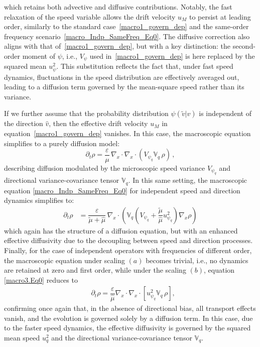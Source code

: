 \documentclass[a4paper]{article}
\theoremstyle{Theorem}\newtheorem{proposition}{Proposition}[section]
\theoremstyle{Remark}\newtheorem{remark}{Remark}[section]
\theoremstyle{Theorem}\newtheorem{theorem}{Theorem}[section]
\newcommand{\hv}{\hat{v}}
\newcommand{\tv}{\tilde{v}}
\newcommand{\hmu}{\hat{\mu}}
\newcommand{\tmu}{\tilde{\mu}}
\begin{document}
which retains both advective and diffusive contributions. Notably, the fast relaxation of the speed variable allows the drift velocity $u_M$ to persist at leading order, similarly to the standard case~\eqref{macro1_govern_dep} and the same-order frequency scenario~\eqref{macro_Indp_SameFreq_Eq0}.  The diffusive correction also aligns with that of~\eqref{macro1_govern_dep}, but with a key distinction: the second-order moment of $\psi$, i.e., $V_\psi$  used in~\eqref{macro1_govern_dep} is here replaced by the squared mean $u_\psi^2$. This substitution reflects the fact that, under fast speed dynamics, fluctuations in the speed distribution are effectively averaged out, leading to a diffusion term governed by the mean-square speed rather than its variance.

If we further assume that the probability distribution $\psi(\tv|\hv)$ is independent of the direction $\hv$, then the effective drift velocity $u_M$ in equation~\eqref{macro1_govern_dep} vanishes. In this case, the macroscopic equation simplifies to a purely diffusion model:
\begin{equation*}\label{macro_Dep_uncond_Eq0}
    \partial_t \rho = \dfrac{\varepsilon}{\mu} \, \nabla_x\cdot\nabla_x\cdot (V_{\psi_q}\mathbb{V}_q \,\rho)\,,
\end{equation*}
describing diffusion modulated by the microscopic speed variance $V_{\psi_q}$ and directional variance-covariance tensor $\mathbb{V}_q$. In this same setting, the macroscopic equation \eqref{macro_Indp_SameFreq_Eq0} for independent speed and direction dynamics simplifies to:
\begin{equation*}\label{macro_Indp_SameFreq_uncond_Eq0}
\begin{split}
    \partial_t \rho & =  \dfrac{\varepsilon}{\tmu+\hmu} \, \nabla_x \cdot\left(\mathbb{V}_q\left(V_{\psi_q}+\dfrac{\tmu}{\hmu}u_{\psi_q}^2\right) \nabla_x\rho\right)
    \end{split}
\end{equation*}
which again has the structure of a diffusion equation, but with an enhanced effective diffusivity due to the decoupling between speed and direction processes. Finally, for the case of independent operators with frequencies of different order, the macroscopic equation under scaling $(a)$ becomes trivial, i.e., no dynamics are retained at zero and first order, while under the scaling $(b)$, equation \eqref{macro3.Eq0} reduces to
\begin{equation*}\label{macro3.Eq0_uncond}
\begin{split}
    &\partial_t \rho =\dfrac{\varepsilon}{\hmu}\nabla_x\cdot\nabla_x \cdot \left[u_{\psi_q}^2\mathbb{V}_q\,\rho\right],
    \end{split}
\end{equation*}
confirming once again that, in the absence of directional bias, all transport effects vanish, and the evolution is governed solely by a diffusion term. In this case, due to the faster speed dynamics, the effective diffusivity is governed by the squared mean speed $u^2_q$ and the directional variance-covariance tensor $\mathbb{V}_q$.
\end{document}
